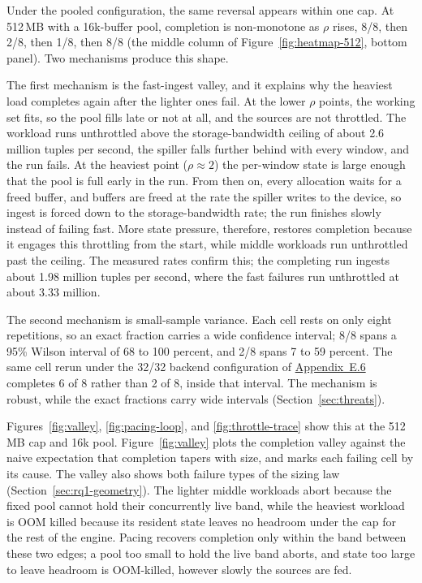 Under the pooled configuration, the same reversal appears within one cap.
At 512\,MB with a 16k-buffer pool, completion is non-monotone as $\rho$ rises, 8/8, then 2/8, then 1/8, then 8/8 (the middle column of Figure~\ref{fig:heatmap-512}, bottom panel).
Two mechanisms produce this shape.

The first mechanism is the fast-ingest valley, and it explains why the heaviest load completes again after the lighter ones fail.
At the lower $\rho$ points, the working set fits, so the pool fills late or not at all, and the sources are not throttled.
The workload runs unthrottled above the storage-bandwidth ceiling of about 2.6 million tuples per second, the spiller falls further behind with every window, and the run fails.
At the heaviest point ($\rho \approx 2$) the per-window state is large enough that the pool is full early in the run.
From then on, every allocation waits for a freed buffer, and buffers are freed at the rate the spiller writes to the device, so ingest is forced down to the storage-bandwidth rate; the run finishes slowly instead of failing fast.
More state pressure, therefore, restores completion because it engages this throttling from the start, while middle workloads run unthrottled past the ceiling.
The measured rates confirm this; the completing run ingests about 1.98 million tuples per second, where the fast failures run unthrottled at about 3.33 million.

The second mechanism is small-sample variance.
Each cell rests on only eight repetitions, so an exact fraction carries a wide confidence interval; 8/8 spans a 95\% Wilson interval of 68 to 100 percent, and 2/8 spans 7 to 59 percent.
The same cell rerun under the 32/32 backend configuration of \hyperref[app:rb32]{Appendix~E.6} completes 6 of 8 rather than 2 of 8, inside that interval.
The mechanism is robust, while the exact fractions carry wide intervals (Section~\ref{sec:threats}).

Figures~\ref{fig:valley}, \ref{fig:pacing-loop}, and \ref{fig:throttle-trace} show this at the 512\,MB cap and 16k pool.
Figure~\ref{fig:valley} plots the completion valley against the naive expectation that completion tapers with size, and marks each failing cell by its cause.
The valley also shows both failure types of the sizing law (Section~\ref{sec:rq1-geometry}).
The lighter middle workloads abort because the fixed pool cannot hold their concurrently live band, while the heaviest workload is OOM killed because its resident state leaves no headroom under the cap for the rest of the engine.
Pacing recovers completion only within the band between these two edges; a pool too small to hold the live band aborts, and state too large to leave headroom is OOM-killed, however slowly the sources are fed.

